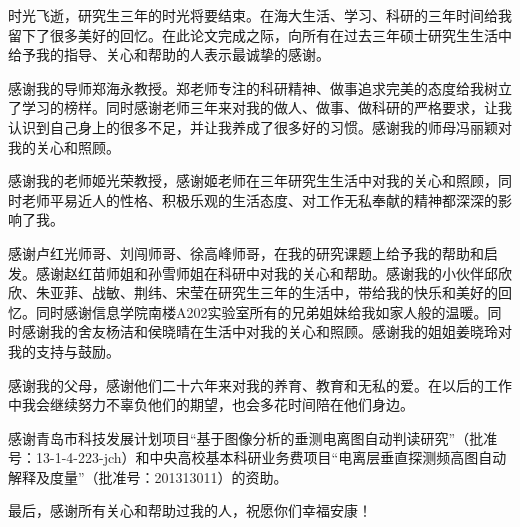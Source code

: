 
\begin{ack}
时光飞逝，研究生三年的时光将要结束。在海大生活、学习、科研的三年时间给我留下了很多美好的回忆。在此论文完成之际，向所有在过去三年硕士研究生生活中给予我的指导、关心和帮助的人表示最诚挚的感谢。

感谢我的导师郑海永教授。郑老师专注的科研精神、做事追求完美的态度给我树立了学习的榜样。同时感谢老师三年来对我的做人、做事、做科研的严格要求，让我认识到自己身上的很多不足，并让我养成了很多好的习惯。感谢我的师母冯丽颖对我的关心和照顾。

感谢我的老师姬光荣教授，感谢姬老师在三年研究生生活中对我的关心和照顾，同时老师平易近人的性格、积极乐观的生活态度、对工作无私奉献的精神都深深的影响了我。

感谢卢红光师哥、刘闯师哥、徐高峰师哥，在我的研究课题上给予我的帮助和启发。感谢赵红苗师姐和孙雪师姐在科研中对我的关心和帮助。感谢我的小伙伴邱欣欣、朱亚菲、战敏、荆纬、宋莹在研究生三年的生活中，带给我的快乐和美好的回忆。同时感谢信息学院南楼A202实验室所有的兄弟姐妹给我如家人般的温暖。同时感谢我的舍友杨洁和侯晓晴在生活中对我的关心和照顾。感谢我的姐姐姜晓玲对我的支持与鼓励。

感谢我的父母，感谢他们二十六年来对我的养育、教育和无私的爱。在以后的工作中我会继续努力不辜负他们的期望，也会多花时间陪在他们身边。

感谢青岛市科技发展计划项目“基于图像分析的垂测电离图自动判读研究”（批准号：13-1-4-223-jch）和中央高校基本科研业务费项目“电离层垂直探测频高图自动解释及度量”（批准号：201313011）的资助。


最后，感谢所有关心和帮助过我的人，祝愿你们幸福安康！
\end{ack}
